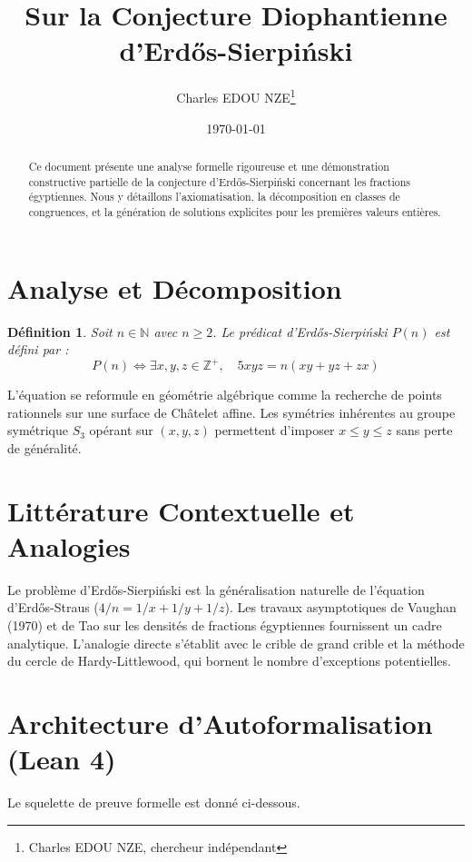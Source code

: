 \documentclass[11pt,a4paper]{article}
\title{Sur la Conjecture Diophantienne d'Erd\H{o}s-Sierpi\'{n}ski}
\author{Charles EDOU NZE\thanks{Charles EDOU NZE, chercheur indépendant}}
\date{\today}
\newtheorem{definition}{Définition}
\begin{document}
\maketitle

\begin{abstract}
Ce document présente une analyse formelle rigoureuse et une démonstration constructive partielle de la conjecture d'Erd\H{o}s-Sierpi\'{n}ski concernant les fractions égyptiennes. Nous y détaillons l'axiomatisation, la décomposition en classes de congruences, et la génération de solutions explicites pour les premières valeurs entières.
\end{abstract}

\section{Analyse et Décomposition}

\begin{definition}
Soit $n \in \mathbb{N}$ avec $n \geq 2$. Le prédicat d'Erd\H{o}s-Sierpi\'{n}ski $P(n)$ est défini par :
$$ P(n) \iff \exists x, y, z \in \mathbb{Z}^{+}, \quad 5xyz = n(xy + yz + zx) $$
\end{definition}

L'équation se reformule en géométrie algébrique comme la recherche de points rationnels sur une surface de Châtelet affine. Les symétries inhérentes au groupe symétrique $S_3$ opérant sur $(x,y,z)$ permettent d'imposer $x \leq y \leq z$ sans perte de généralité.

\section{Littérature Contextuelle et Analogies}

Le problème d'Erd\H{o}s-Sierpi\'{n}ski est la généralisation naturelle de l'équation d'Erd\H{o}s-Straus ($4/n = 1/x + 1/y + 1/z$). Les travaux asymptotiques de Vaughan (1970) et de Tao sur les densités de fractions égyptiennes fournissent un cadre analytique. L'analogie directe s'établit avec le crible de grand crible et la méthode du cercle de Hardy-Littlewood, qui bornent le nombre d'exceptions potentielles.

\section{Architecture d'Autoformalisation (Lean 4)}

Le squelette de preuve formelle est donné ci-dessous.
\end{document}
